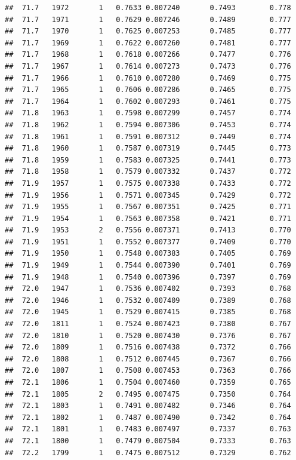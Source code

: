 \documentclass[
]{book}
\begin{document}
\begin{verbatim}
##  71.7   1972       1   0.7633 0.007240       0.7493        0.778
##  71.7   1971       1   0.7629 0.007246       0.7489        0.777
##  71.7   1970       1   0.7625 0.007253       0.7485        0.777
##  71.7   1969       1   0.7622 0.007260       0.7481        0.777
##  71.7   1968       1   0.7618 0.007266       0.7477        0.776
##  71.7   1967       1   0.7614 0.007273       0.7473        0.776
##  71.7   1966       1   0.7610 0.007280       0.7469        0.775
##  71.7   1965       1   0.7606 0.007286       0.7465        0.775
##  71.7   1964       1   0.7602 0.007293       0.7461        0.775
##  71.8   1963       1   0.7598 0.007299       0.7457        0.774
##  71.8   1962       1   0.7594 0.007306       0.7453        0.774
##  71.8   1961       1   0.7591 0.007312       0.7449        0.774
##  71.8   1960       1   0.7587 0.007319       0.7445        0.773
##  71.8   1959       1   0.7583 0.007325       0.7441        0.773
##  71.8   1958       1   0.7579 0.007332       0.7437        0.772
##  71.9   1957       1   0.7575 0.007338       0.7433        0.772
##  71.9   1956       1   0.7571 0.007345       0.7429        0.772
##  71.9   1955       1   0.7567 0.007351       0.7425        0.771
##  71.9   1954       1   0.7563 0.007358       0.7421        0.771
##  71.9   1953       2   0.7556 0.007371       0.7413        0.770
##  71.9   1951       1   0.7552 0.007377       0.7409        0.770
##  71.9   1950       1   0.7548 0.007383       0.7405        0.769
##  71.9   1949       1   0.7544 0.007390       0.7401        0.769
##  71.9   1948       1   0.7540 0.007396       0.7397        0.769
##  72.0   1947       1   0.7536 0.007402       0.7393        0.768
##  72.0   1946       1   0.7532 0.007409       0.7389        0.768
##  72.0   1945       1   0.7529 0.007415       0.7385        0.768
##  72.0   1811       1   0.7524 0.007423       0.7380        0.767
##  72.0   1810       1   0.7520 0.007430       0.7376        0.767
##  72.0   1809       1   0.7516 0.007438       0.7372        0.766
##  72.0   1808       1   0.7512 0.007445       0.7367        0.766
##  72.0   1807       1   0.7508 0.007453       0.7363        0.766
##  72.1   1806       1   0.7504 0.007460       0.7359        0.765
##  72.1   1805       2   0.7495 0.007475       0.7350        0.764
##  72.1   1803       1   0.7491 0.007482       0.7346        0.764
##  72.1   1802       1   0.7487 0.007490       0.7342        0.764
##  72.1   1801       1   0.7483 0.007497       0.7337        0.763
##  72.1   1800       1   0.7479 0.007504       0.7333        0.763
##  72.2   1799       1   0.7475 0.007512       0.7329        0.762

\end{verbatim}
\end{document}
